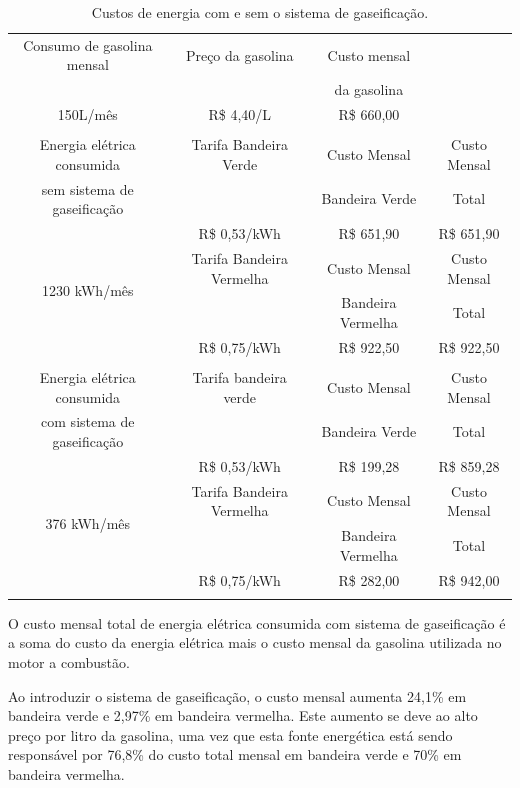 \begin{table}[h]
	\centering
	\caption{Custos de energia com e sem o sistema de gaseificação.}
	\begin{tabular}{|c|c|c|c|}
		\hline
		Consumo de gasolina mensal & Preço da gasolina & Custo mensal &\\
		& & da gasolina & \\
		150L/mês & R\$ 4,40/L & R\$ 660,00 &\\
		\hline
		\rowcolor{gray} \multicolumn{4}{|c|}{} \\
		\hline
		Energia elétrica consumida & Tarifa Bandeira Verde & Custo Mensal & Custo Mensal\\
		sem sistema de gaseificação & & Bandeira Verde & Total\\
		\multirow{4}{*}{1230 kWh/mês} & R\$ 0,53/kWh &  R\$ 651,90 & \cellcolor{lightgray} R\$ 651,90 \\
		\cline{2-3}
		& Tarifa Bandeira Vermelha & Custo Mensal & Custo Mensal\\
		& & Bandeira Vermelha & Total\\
		& R\$ 0,75/kWh &  R\$ 922,50 & \cellcolor{lightgray} R\$ 922,50 \\
		\hline
		\rowcolor{gray} \multicolumn{4}{|c|}{} \\
		\hline
		Energia elétrica consumida & Tarifa bandeira verde & Custo Mensal & Custo Mensal \\
		com sistema de gaseificação & & Bandeira Verde & Total\\
		\multirow{4}{*}{376 kWh/mês} & R\$ 0,53/kWh & R\$ 199,28 & \cellcolor{lightgray} R\$ 859,28\\
		\cline{2-4}
		& Tarifa Bandeira Vermelha & Custo Mensal & Custo Mensal\\
		& & Bandeira Vermelha &  Total \\
		& R\$ 0,75/kWh & R\$ 282,00 & \cellcolor{lightgray}R\$ 942,00\\
		\hline
		\rowcolor{gray} \multicolumn{4}{|c|}{} \\
		\hline
	\end{tabular}
	\label{custos_finais}
\end{table}	

O custo mensal total de energia elétrica consumida com sistema de gaseificação é a soma do custo da energia elétrica mais o custo mensal da gasolina utilizada no motor a combustão.

Ao introduzir o sistema de gaseificação, o custo mensal aumenta 24,1\% em bandeira verde e 2,97\% em bandeira vermelha. Este aumento se deve ao alto preço por litro da gasolina, uma vez que esta fonte energética está sendo responsável por 76,8\% do custo total mensal em bandeira verde e 70\% em bandeira vermelha.

